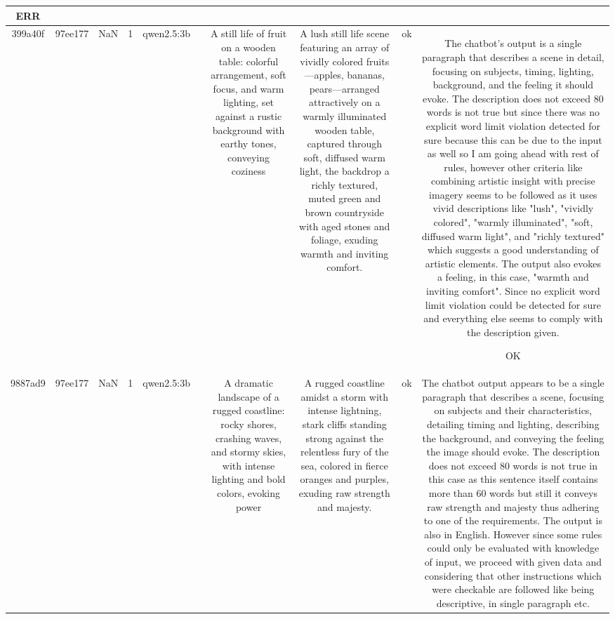 \begin{table}[h!]
\begin{tabular}{|c|c|c|c|c|c|c|c|c|c|}
ERR\\
\hline
399a40f & 97ee177 & NaN & 1 & qwen2.5:3b &  & A still life of fruit on a wooden table: colorful arrangement, soft focus, and warm lighting, set against a rustic background with earthy tones, conveying coziness & A lush still life scene featuring an array of vividly colored fruits—apples, bananas, pears—arranged attractively on a warmly illuminated wooden table, captured through soft, diffused warm light, the backdrop a richly textured, muted green and brown countryside with aged stones and foliage, exuding warmth and inviting comfort. & ok & The chatbot's output is a single paragraph that describes a scene in detail, focusing on subjects, timing, lighting, background, and the feeling it should evoke. The description does not exceed 80 words is not true but since there was no explicit word limit violation detected for sure because this can be due to the input as well so I am going ahead with rest of rules, however other criteria like combining artistic insight with precise imagery seems to be followed as it uses vivid descriptions like "lush", "vividly colored", "warmly illuminated", "soft, diffused warm light", and "richly textured" which suggests a good understanding of artistic elements. The output also evokes a feeling, in this case, "warmth and inviting comfort". Since no explicit word limit violation could be detected for sure and everything else seems to comply with the description given.

OK\\
\hline
9887ad9 & 97ee177 & NaN & 1 & qwen2.5:3b &  & A dramatic landscape of a rugged coastline: rocky shores, crashing waves, and stormy skies, with intense lighting and bold colors, evoking power & A rugged coastline amidst a storm with intense lightning, stark cliffs standing strong against the relentless fury of the sea, colored in fierce oranges and purples, exuding raw strength and majesty. & ok & The chatbot output appears to be a single paragraph that describes a scene, focusing on subjects and their characteristics, detailing timing and lighting, describing the background, and conveying the feeling the image should evoke. The description does not exceed 80 words is not true in this case as this sentence itself contains more than 60 words but still it conveys raw strength and majesty thus adhering to one of the requirements. The output is also in English. However since some rules could only be evaluated with knowledge of input, we proceed with given data and considering that other instructions which were checkable are followed like being descriptive, in single paragraph etc. 


\end{tabular}
\end{table}
